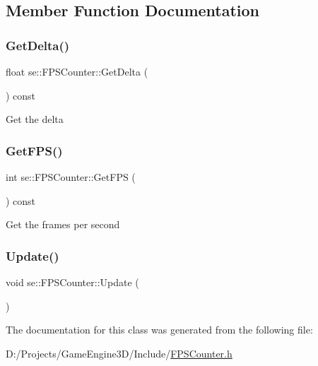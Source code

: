 \subsection{Member Function Documentation}
\mbox{\label{classse_1_1_f_p_s_counter_ac39be1bd1ff3954813d6d5733825abb1}} 
\subsubsection{\texorpdfstring{Get\+Delta()}{GetDelta()}}
{\footnotesize\ttfamily float se\+::\+F\+P\+S\+Counter\+::\+Get\+Delta (\begin{DoxyParamCaption}{ }\end{DoxyParamCaption}) const}

Get the delta \mbox{\label{classse_1_1_f_p_s_counter_a6e3fc56e01f9696ce549264f6246fa01}} 
\subsubsection{\texorpdfstring{Get\+F\+P\+S()}{GetFPS()}}
{\footnotesize\ttfamily int se\+::\+F\+P\+S\+Counter\+::\+Get\+F\+PS (\begin{DoxyParamCaption}{ }\end{DoxyParamCaption}) const}

Get the frames per second \mbox{\label{classse_1_1_f_p_s_counter_a863da58355d25fcf9f76b9cc697101e4}} 
\subsubsection{\texorpdfstring{Update()}{Update()}}
{\footnotesize\ttfamily void se\+::\+F\+P\+S\+Counter\+::\+Update (\begin{DoxyParamCaption}{ }\end{DoxyParamCaption})}



The documentation for this class was generated from the following file\+:\begin{DoxyCompactItemize}
\item 
D\+:/\+Projects/\+Game\+Engine3\+D/\+Include/\mbox{\hyperlink{_f_p_s_counter_8h}{F\+P\+S\+Counter.\+h}}\end{DoxyCompactItemize}
